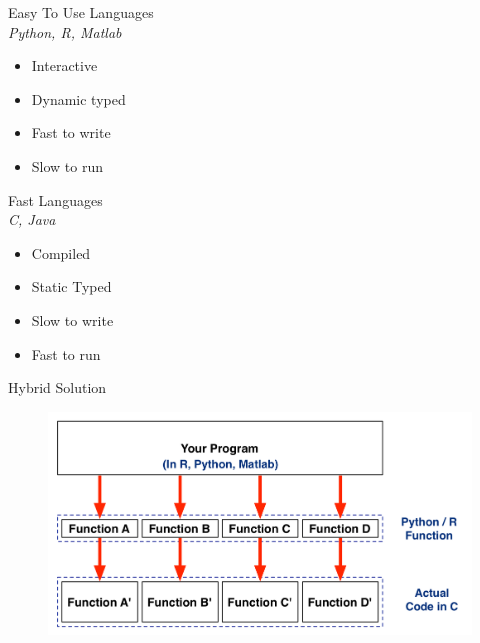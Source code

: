 \documentclass[11pt]{beamer}
\begin{document}
\begin{frame}{}
\centering
\pause
    \begin{minipage}[t]{0.48\linewidth}
        \begin{center}
            Easy To Use Languages\\
            \emph{Python, R, Matlab}
        \end{center}
        \begin{itemize}
            \item<3-> Interactive
            \item<4-> Dynamic typed
            \item<5-> Fast to write
            \item<6-> Slow to run
        \end{itemize}
    \end{minipage}
    \vrule{}
    \begin{minipage}[t]{0.48\linewidth}%
        \begin{center}
            Fast Languages\\
            \emph{C, Java}
        \end{center}
        \begin{itemize}
            \item<3-> Compiled
            \item<4-> Static Typed
            \item<5-> Slow to write
            \item<6-> Fast to run
        \end{itemize}
    \end{minipage}
\end{frame}

\begin{frame}[c]{Hybrid Solution}
    \begin{figure}
        \includegraphics[width=\textwidth]{figures/wrappers.png}
    \end{figure}
\end{frame}
\end{document}
